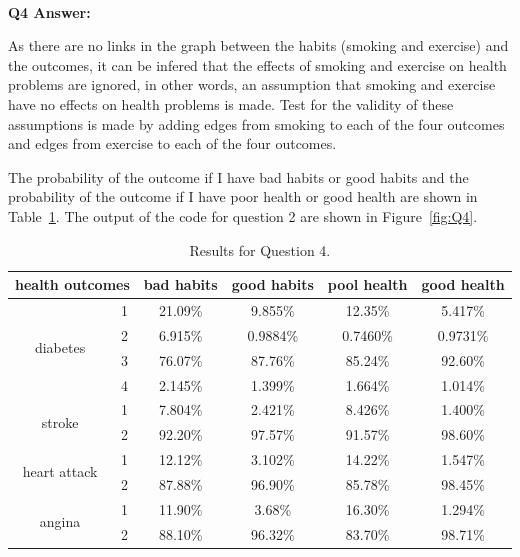 \documentclass[aps,letterpaper,10pt]{revtex4}
\begin{document}

 ~\\
 \textbf{Q4 Answer:} 

As there are no links in the graph between the habits (smoking and exercise) and the outcomes, it can be infered that the effects of smoking and exercise on health problems are ignored, in other words, an assumption that smoking and exercise have no effects on health problems is made.  Test for the validity of these assumptions is made by adding edges from smoking to each of the four outcomes and edges from exercise to each of the four outcomes.

The probability of the outcome if I have bad habits or good habits and the probability of the outcome if I have poor health or good health are shown in Table~\ref{table:Q4}. The output of the code for question 2 are shown in Figure~\ref{fig:Q4}.

\begin{table}[H]
    \centering
    \begin{tabular}{|c|c|c|c|c|c|}
    \hline
    \multicolumn{2}{|c|}{health outcomes} & bad habits & good habits & pool health & good health \\ \hline
    \multirow{4}{*}{diabetes}       & 1   & 21.09\%    & 9.855\%     & 12.35\%     & 5.417\%     \\ \cline{2-6} 
                                    & 2   & 6.915\%    & 0.9884\%    & 0.7460\%    & 0.9731\%    \\ \cline{2-6} 
                                    & 3   & 76.07\%    & 87.76\%     & 85.24\%     & 92.60\%     \\ \cline{2-6} 
                                    & 4   & 2.145\%    & 1.399\%     & 1.664\%     & 1.014\%     \\ \hline
    \multirow{2}{*}{stroke}         & 1   & 7.804\%    & 2.421\%     & 8.426\%     & 1.400\%     \\ \cline{2-6} 
                                    & 2   & 92.20\%    & 97.57\%     & 91.57\%     & 98.60\%     \\ \hline
    \multirow{2}{*}{heart attack}   & 1   & 12.12\%    & 3.102\%     & 14.22\%     & 1.547\%     \\ \cline{2-6} 
                                    & 2   & 87.88\%    & 96.90\%     & 85.78\%     & 98.45\%     \\ \hline
    \multirow{2}{*}{angina}         & 1   & 11.90\%    & 3.68\%      & 16.30\%     & 1.294\%     \\ \cline{2-6} 
                                    & 2   & 88.10\%    & 96.32\%     & 83.70\%     & 98.71\%     \\ \hline
    \end{tabular}
    \caption{Results for Question 4.}
    \label{table:Q4}
\end{table}
\end{document}
